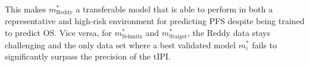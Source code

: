 This makes $m^*_\text{Reddy}$ a transferable model that is 
able to perform in both a representative and high-risk environment for predicting PFS despite being 
trained to predict OS. Vice versa, for $m^*_\text{Schmitz}$ and $m^*_\text{Staiger}$, the Reddy data 
stays challenging and the only data set where a best validated model $m^*_i$ fails to significantly 
surpass the precision of the tIPI.
